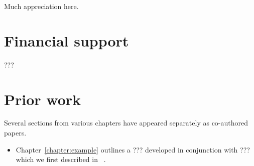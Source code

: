 Much appreciation here.

\section*{Financial support}
???

\section*{Prior work}
Several sections from various chapters have appeared separately as co-authored papers. 
\begin{itemize} 
\item Chapter~\ref{chapter:example} outlines a ??? developed in conjunction with ??? which we first described in ~\citet{???}. 
\end{itemize}